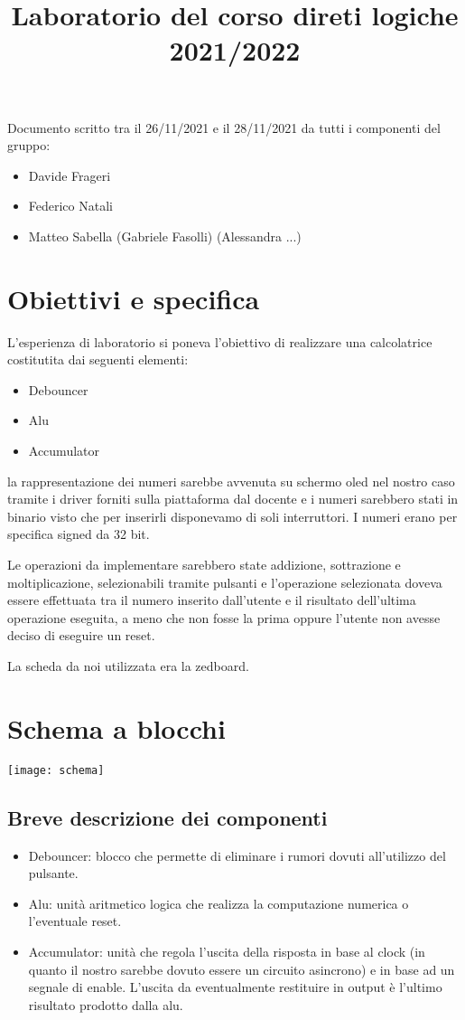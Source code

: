 \documentclass{report}
\title{Laboratorio del corso direti logiche 2021/2022}
\begin{document}
Documento scritto tra il 26/11/2021 e il 28/11/2021 da tutti i componenti del gruppo:
\begin{itemize}
\item Davide Frageri
\item Federico Natali
\item Matteo Sabella
(Gabriele Fasolli)
(Alessandra ...)
\end{itemize}


\section*{Obiettivi e specifica}

L'esperienza di laboratorio si poneva l'obiettivo di realizzare una calcolatrice costitutita dai seguenti elementi:

\begin{itemize}
\item Debouncer
\item Alu
\item Accumulator
\end{itemize}

la rappresentazione dei numeri sarebbe avvenuta su schermo oled nel nostro caso tramite i driver forniti sulla piattaforma dal docente e i numeri sarebbero stati in binario visto che per inserirli disponevamo di soli interruttori.
I numeri erano per specifica signed da 32 bit.

Le operazioni da implementare sarebbero state addizione, sottrazione e moltiplicazione, selezionabili tramite pulsanti e l'operazione selezionata doveva essere effettuata tra il numero inserito dall'utente e il risultato dell'ultima operazione eseguita, a meno che non fosse la prima oppure l'utente non avesse deciso di eseguire un reset.

La scheda da noi utilizzata era la zedboard.


\section*{Schema a blocchi}


\texttt{[image: schema]}



\subsection*{Breve descrizione dei componenti}
\begin{itemize}
\item Debouncer:
blocco che permette di eliminare i rumori dovuti all'utilizzo del pulsante.
\item Alu:
unità aritmetico logica che realizza la computazione  numerica o l'eventuale reset.
\item Accumulator:
unità che regola l'uscita della risposta in base al clock (in quanto il nostro sarebbe dovuto essere un circuito asincrono) e in base ad un segnale di enable.
L'uscita da eventualmente restituire in output è l'ultimo risultato prodotto dalla alu.

\end{itemize}
\end{document}
